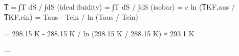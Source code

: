 T̅ = ∫T dS / ∫dS (ideal fluidity)  
= ∫T dS / ∫dS (isobar)  
= c ln (T̅KF,aus / T̅KF,ein)  
= Taus - Tein / ln (Taus / Tein)  

= 298.15 K - 288.15 K / ln (298.15 K / 288.15 K)  
≈ 293.1 K  

---